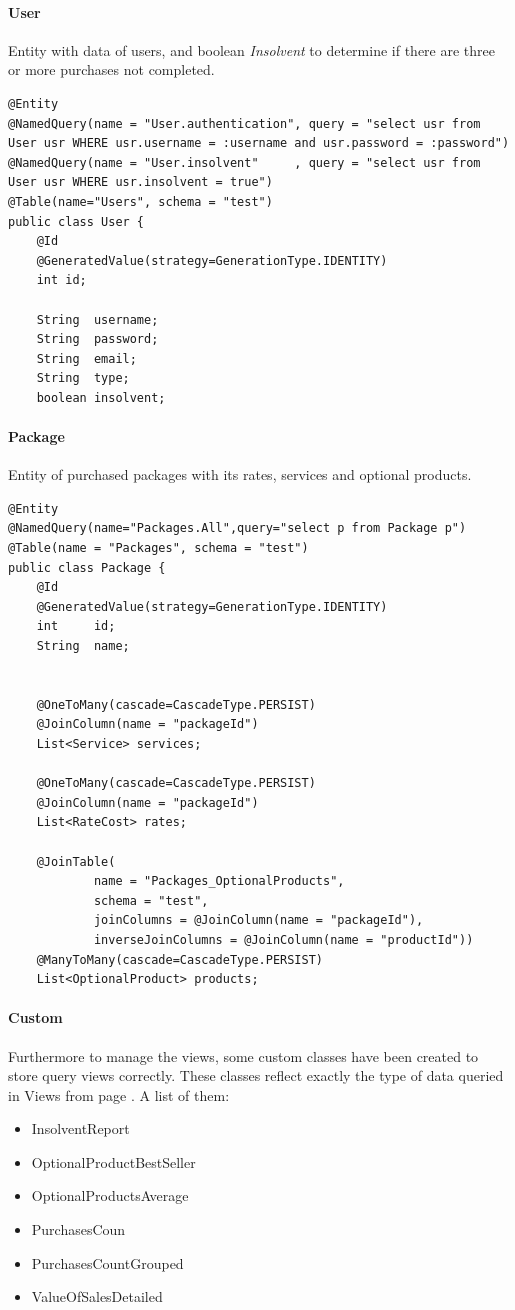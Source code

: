 \documentclass{article}
\begin{document}
\paragraph{User}
Entity with data of users, and boolean \emph{Insolvent} to determine if there are three or more purchases not completed.
\begin{lstlisting}
@Entity
@NamedQuery(name = "User.authentication", query = "select usr from User usr WHERE usr.username = :username and usr.password = :password")
@NamedQuery(name = "User.insolvent"     , query = "select usr from User usr WHERE usr.insolvent = true")
@Table(name="Users", schema = "test")
public class User {
    @Id
    @GeneratedValue(strategy=GenerationType.IDENTITY)
    int id;

    String  username;
    String  password;
    String  email;
    String  type;
    boolean insolvent;
\end{lstlisting}

\paragraph{Package}
Entity of purchased packages with its rates, services and optional products.
\begin{lstlisting}
@Entity
@NamedQuery(name="Packages.All",query="select p from Package p")
@Table(name = "Packages", schema = "test")
public class Package {
    @Id
    @GeneratedValue(strategy=GenerationType.IDENTITY)
    int     id;
    String  name;


    @OneToMany(cascade=CascadeType.PERSIST)
    @JoinColumn(name = "packageId")
    List<Service> services;

    @OneToMany(cascade=CascadeType.PERSIST)
    @JoinColumn(name = "packageId")
    List<RateCost> rates;

    @JoinTable(
            name = "Packages_OptionalProducts",
            schema = "test",
            joinColumns = @JoinColumn(name = "packageId"),
            inverseJoinColumns = @JoinColumn(name = "productId"))
    @ManyToMany(cascade=CascadeType.PERSIST)
    List<OptionalProduct> products;
\end{lstlisting}

\paragraph{Custom}
Furthermore to manage the views, some custom classes have been created to store query views correctly. These classes reflect exactly the type of data queried in Views from page \pageref{views}.
A list of them:
\begin{itemize}
    \item InsolventReport
    \item OptionalProductBestSeller
    \item OptionalProductsAverage
    \item PurchasesCoun
    \item PurchasesCountGrouped
    \item ValueOfSalesDetailed
\end{itemize}
\end{document}

